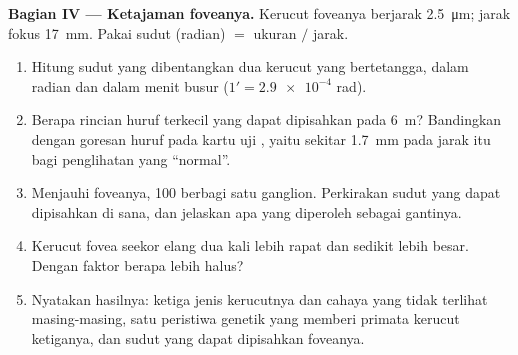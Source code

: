 \begin{problem}
\medskip
\noindent\textbf{Bagian IV --- Ketajaman foveanya.}
Kerucut foveanya berjarak \qty{2.5}{\micro m}; jarak fokus 
\qty{17}{mm}. Pakai sudut (radian) $=$ ukuran $/$ jarak.
\begin{enumerate}[resume]
  \item Hitung sudut yang dibentangkan dua kerucut yang bertetangga,
        dalam radian dan dalam menit busur ($1' = \num{2.9e-4}$ rad).
  \item Berapa rincian huruf terkecil yang dapat dipisahkan pada
        \qty{6}{m}? Bandingkan dengan goresan huruf pada kartu uji
        , yaitu sekitar \qty{1.7}{mm} pada jarak itu bagi
        penglihatan yang ``normal''.
  \item Menjauhi foveanya, 100  berbagi satu  ganglion.
        Perkirakan sudut yang dapat dipisahkan di sana, dan jelaskan
        apa yang diperoleh sebagai gantinya.
  \item Kerucut fovea seekor elang dua kali lebih rapat dan 
        sedikit lebih besar. Dengan faktor berapa  lebih halus?
  \item Nyatakan hasilnya: ketiga jenis kerucutnya dan cahaya yang
        tidak terlihat masing-masing, satu peristiwa genetik yang
        memberi primata kerucut ketiganya, dan sudut yang dapat
        dipisahkan foveanya.
\end{enumerate}
\end{problem}
